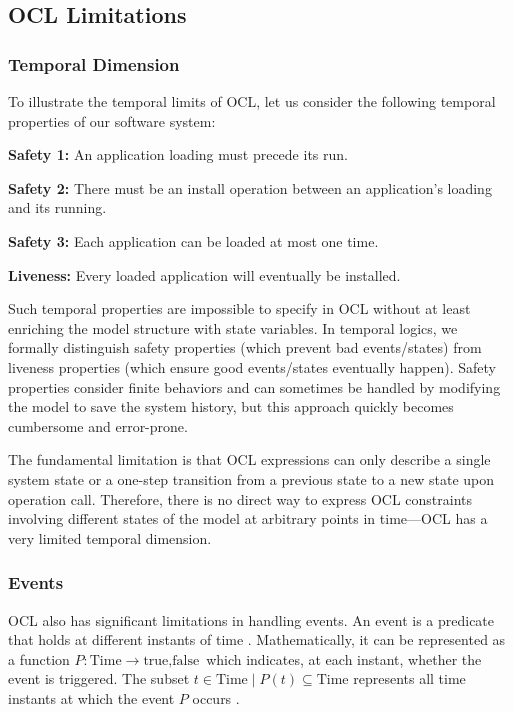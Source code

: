 \subsection{OCL Limitations}

\subsubsection{Temporal Dimension}
To illustrate the temporal limits of OCL, let us consider the following temporal 
properties of our software system: 

\begin{mdframed}
    \item \textbf{Safety 1:} An application loading must precede its run.
    \item \textbf{Safety 2:} There must be an install operation between an application's loading and its running.
    \item \textbf{Safety 3:} Each application can be loaded at most one time.
    \item \textbf{Liveness:} Every loaded application will eventually be installed.
    \label{fig:temporal_properties}
\end{mdframed}

Such temporal properties are impossible to specify in OCL without at least enriching 
the model structure with state variables. In temporal logics, we formally distinguish 
safety properties (which prevent bad events/states) from liveness properties (which 
ensure good events/states eventually happen). Safety properties consider finite 
behaviors and can sometimes be handled by modifying the model to save the system 
history, but this approach quickly becomes cumbersome and error-prone.

The fundamental limitation is that OCL expressions can only describe a single system 
state or a one-step transition from a previous state to a new state upon operation 
call. Therefore, there is no direct way to express OCL constraints involving different 
states of the model at arbitrary points in time—OCL has a very limited temporal 
dimension.

\subsubsection{Events}
OCL also has significant limitations in handling events. An event is a predicate that 
holds at different instants of time . Mathematically, it can be represented as a 
function 
$P : \text{Time} \rightarrow {\text{true}, \text{false}}$ 
which indicates, at each instant, whether the event is triggered. The subset 
${t \in \text{Time} \mid P(t)} \subseteq \text{Time}$ 
represents all time instants at which the event $P$ occurs \cite{TemporalAndEventOCL}.

